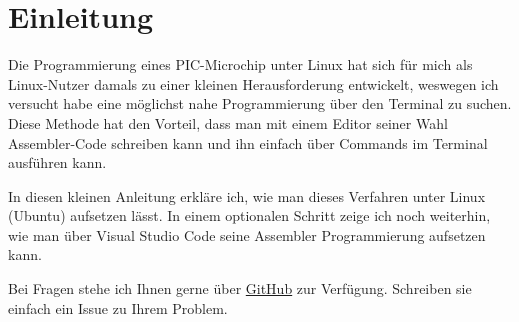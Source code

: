 \section{Einleitung}
\label{sec:einleitung}
Die Programmierung eines PIC-Microchip unter Linux hat sich für mich als Linux-Nutzer damals zu einer kleinen Herausforderung entwickelt, weswegen ich versucht habe eine möglichst nahe Programmierung über den Terminal zu suchen. Diese Methode hat den Vorteil, dass man mit einem Editor seiner Wahl Assembler-Code schreiben kann und ihn einfach über Commands im Terminal ausführen kann.

In diesen kleinen Anleitung erkläre ich, wie man dieses Verfahren unter Linux (Ubuntu) aufsetzen lässt. In einem optionalen Schritt zeige ich noch weiterhin, wie man über Visual Studio Code seine Assembler Programmierung aufsetzen kann.

Bei Fragen stehe ich Ihnen gerne über \href{https://github.com/ManeLippert/AssemblerVSCode}{GitHub} zur Verfügung. Schreiben sie einfach ein Issue zu Ihrem Problem.